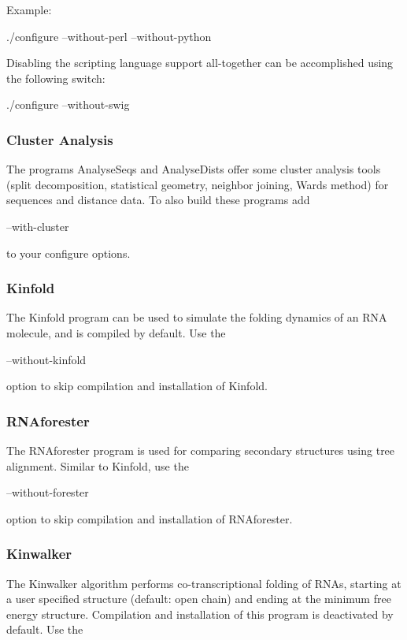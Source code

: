 Example\+:

\begin{DoxyVerb}./configure --without-perl --without-python
\end{DoxyVerb}


Disabling the scripting language support all-\/together can be accomplished using the following switch\+: \begin{DoxyVerb}./configure --without-swig
\end{DoxyVerb}
\hypertarget{install_config_cluster}{}\subsubsection{Cluster Analysis}\label{install_config_cluster}
The programs Analyse\+Seqs and Analyse\+Dists offer some cluster analysis tools (split decomposition, statistical geometry, neighbor joining, Ward\textquotesingle{}s method) for sequences and distance data. To also build these programs add

\begin{DoxyVerb}--with-cluster
\end{DoxyVerb}


to your configure options.\hypertarget{install_config_kinfold}{}\subsubsection{Kinfold}\label{install_config_kinfold}
The Kinfold program can be used to simulate the folding dynamics of an R\+NA molecule, and is compiled by default. Use the

\begin{DoxyVerb}--without-kinfold
\end{DoxyVerb}


option to skip compilation and installation of Kinfold.\hypertarget{install_config_forester}{}\subsubsection{R\+N\+Aforester}\label{install_config_forester}
The R\+N\+Aforester program is used for comparing secondary structures using tree alignment. Similar to Kinfold, use the

\begin{DoxyVerb}--without-forester
\end{DoxyVerb}


option to skip compilation and installation of R\+N\+Aforester.\hypertarget{install_config_kinwalker}{}\subsubsection{Kinwalker}\label{install_config_kinwalker}
The Kinwalker algorithm performs co-\/transcriptional folding of R\+N\+As, starting at a user specified structure (default\+: open chain) and ending at the minimum free energy structure. Compilation and installation of this program is deactivated by default. Use the

